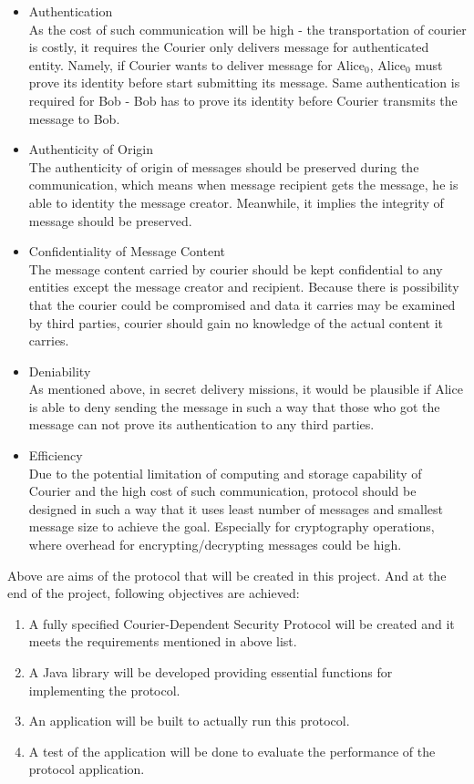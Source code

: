 \begin{itemize}
\item Authentication \\
As the cost of such communication will be high - the transportation of courier is costly, it requires the Courier only delivers message for authenticated entity. Namely, if Courier wants to deliver message for Alice$_0$, Alice$_0$ must prove its identity before start submitting its message. Same authentication is required for Bob - Bob has to prove its identity before Courier transmits the message to Bob.

\item Authenticity of Origin \\
The authenticity of origin of messages should be preserved during the communication, which means when message recipient gets the message, he is able to identity the message creator. Meanwhile, it implies the integrity of message should be preserved.

\item Confidentiality of Message Content \\
The message content carried by courier should be kept confidential to any entities except the message creator and recipient. Because there is possibility that the courier could be compromised and data it carries may be examined by third parties, courier should gain no knowledge of the actual content it carries.

\item Deniability \\
As mentioned above, in secret delivery missions, it would be plausible if Alice is able to deny sending the message in such a way that those who got the message can not prove its authentication to any third parties.

\item Efficiency \\
Due to the potential limitation of computing and storage capability of Courier and the high cost of such communication, protocol should be designed in such a way that it uses least number of messages and smallest message size to achieve the goal. Especially for cryptography operations, where overhead for encrypting/decrypting messages could be high.
\end{itemize}

\noindent
Above are aims of the protocol that will be created in this project. And at the end of the project, following objectives are achieved:
\begin{enumerate}
\item A fully specified Courier-Dependent Security Protocol will be created and it meets the requirements mentioned in above list.
\item A Java library will be developed providing essential functions for implementing the protocol.
\item An application will be built to actually run this protocol.
\item A test of the application will be done to evaluate the performance of the protocol application.
\end{enumerate}

